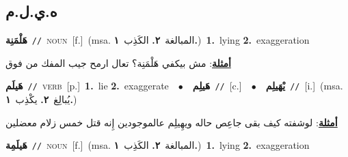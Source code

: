 \documentclass[10pt,a4paper,twoside]{article} %
\begin{document}
\begin{multicols}{2}
\vspace{-3mm}
\subsection*{\color{blue}\foreignlanguage{arabic}{ه.ي.ل.م}\color{blue}{}} 

{\setlength\topsep{0pt}\textbf{\foreignlanguage{arabic}{هَلْمَنِة}}\ {\color{gray}\texttt{//}\color{black}}\ \textsc{noun}\ [f.]\ \color{gray}(msa. \foreignlanguage{arabic}{المبالغة}~\foreignlanguage{arabic}{\textbf{٢.}}  \foreignlanguage{arabic}{الكَذِب}~\foreignlanguage{arabic}{\textbf{١.}})\color{black}\ \textbf{1.}~lying  \textbf{2.}~exaggeration\  \begin{flushright}\color{gray}\foreignlanguage{arabic}{\textbf{\underline{\foreignlanguage{arabic}{أمثلة}}}: مش بيكفي هَلْمَنِة؟ تعال ارمح جيب المفك من فوق}\end{flushright}\color{black}} \vspace{2mm}

{\setlength\topsep{0pt}\textbf{\foreignlanguage{arabic}{هَيلَم}}\ {\color{gray}\texttt{//}\color{black}}\ \textsc{verb}\ [p.]\ \textbf{1.}~lie  \textbf{2.}~exaggerate\ \ $\bullet$\ \ \setlength\topsep{0pt}\textbf{\foreignlanguage{arabic}{هَيلِم}}\ {\color{gray}\texttt{//}\color{black}}\ [c.]\ \ $\bullet$\ \ \setlength\topsep{0pt}\textbf{\foreignlanguage{arabic}{يْهَيلِم}}\ {\color{gray}\texttt{//}\color{black}}\ [i.]\ \color{gray}(msa. \foreignlanguage{arabic}{يُبالِغ}~\foreignlanguage{arabic}{\textbf{٢.}}  \foreignlanguage{arabic}{يكْذِب}~\foreignlanguage{arabic}{\textbf{١.}})\color{black}\  \begin{flushright}\color{gray}\foreignlanguage{arabic}{\textbf{\underline{\foreignlanguage{arabic}{أمثلة}}}: لوشفته كيف بقى جاعِص حاله ويهِيلِم عالموجودين إِنه قتل خمس زلام معضلين}\end{flushright}\color{black}} \vspace{2mm}

{\setlength\topsep{0pt}\textbf{\foreignlanguage{arabic}{هَيلَمِة}}\ {\color{gray}\texttt{//}\color{black}}\ \textsc{noun}\ [f.]\ \color{gray}(msa. \foreignlanguage{arabic}{المبالغة}~\foreignlanguage{arabic}{\textbf{٢.}}  \foreignlanguage{arabic}{الكَذِب}~\foreignlanguage{arabic}{\textbf{١.}})\color{black}\ \textbf{1.}~lying  \textbf{2.}~exaggeration\ } \vspace{2mm}


\end{multicols}
\end{document}
